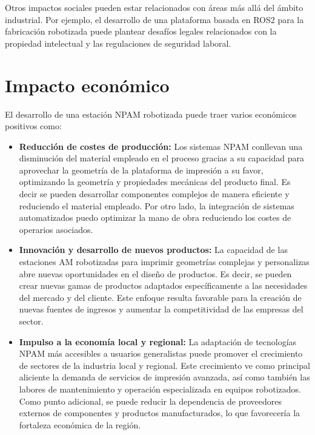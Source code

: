 Otros impactos sociales pueden estar relacionados con áreas más allá del ámbito industrial. Por ejemplo, el desarrollo de una plataforma basada en ROS2 para la fabricación robotizada puede plantear desafíos legales relacionados con la propiedad intelectual y las regulaciones de seguridad laboral.


\section{Impacto económico}
El desarrollo de una estación \acrshort{NPAM} robotizada puede traer varios económicos positivos como:
\begin{itemize}
    \item \textbf{Reducción de costes de producción:} Los sistemas \acrshort{NPAM} conllevan una disminución del material empleado en el proceso gracias a su capacidad para aprovechar la geometría de la plataforma de impresión a su favor, optimizando la geometría y propiedades mecánicas del producto final. Es decir se pueden desarrollar componentes complejos de manera eficiente y reduciendo el material empleado. Por otro lado, la integración de sistemas automatizados puedo optimizar la mano de obra reduciendo los costes de operarios asociados.
    \item \textbf{Innovación y desarrollo de nuevos productos:} La capacidad de las estaciones \acrshort{AM} robotizadas para imprimir geometrías complejas y personalizas abre nuevas oportunidades en el diseño de productos. Es decir, se pueden crear nuevas gamas de productos adaptados específicamente a las necesidades del mercado y del cliente. Este enfoque resulta favorable para la creación de nuevas fuentes de ingresos y aumentar la competitividad de las empresas del sector.
    \item \textbf{Impulso a la economía local y regional:} La adaptación de tecnologías \acrshort{NPAM} más accesibles a usuarios generalistas puede promover el crecimiento de sectores de la industria local y regional. Este crecimiento ve como principal aliciente la demanda de servicios de impresión avanzada, así como también las labores de mantenimiento y operación especializada en equipos robotizados. Como punto adicional, se puede reducir la dependencia de proveedores externos de componentes y productos manufacturados, lo que favorecería la fortaleza económica de la región.
\end{itemize}

